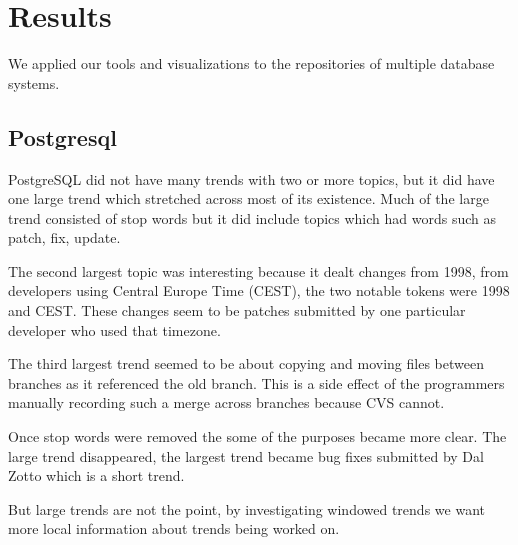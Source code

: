 \documentclass[times, 10pt,twocolumn]{article}
\begin{document}










\section{Results}

We applied our tools and visualizations to the repositories of
multiple database systems. 




\subsection{Postgresql}


PostgreSQL did not have many trends with two or more topics, but it
did have one large trend which stretched across most of its
existence. Much of the large trend consisted of stop words but it did
include topics which had words such as patch, fix, update.

The second largest topic was interesting because it dealt changes from
1998, from developers using Central Europe Time (CEST), the two
notable tokens were 1998 and CEST. These changes seem to be patches
submitted by one particular developer who used that timezone.

The third largest trend seemed to be about copying and moving files
between branches as it referenced the old branch. This is a side
effect of the programmers manually recording such a merge across
branches because CVS cannot.

Once stop words were removed the some of the purposes became more
clear. The large trend disappeared, the largest trend became bug fixes
submitted by Dal Zotto which is a short trend.



But large trends are not the point, by investigating windowed trends
we want more local information about trends being worked on.
\end{document}
